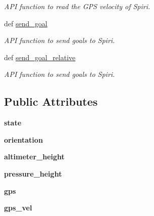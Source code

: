 \begin{DoxyCompactItemize}
\begin{DoxyCompactList}\small\item\em \-A\-P\-I function to read the \-G\-P\-S velocity of \-Spiri. \end{DoxyCompactList}\item 
def \hyperlink{classplanner__request_1_1get__state_1_1_staterobot_a8e0ac5967abcc4612fde86cc3e91654d}{send\-\_\-goal}
\begin{DoxyCompactList}\small\item\em \-A\-P\-I function to send goals to \-Spiri. \end{DoxyCompactList}\item 
def \hyperlink{classplanner__request_1_1get__state_1_1_staterobot_a0bd7ca2bc1f416e09cb2590ae20029a1}{send\-\_\-goal\-\_\-relative}
\begin{DoxyCompactList}\small\item\em \-A\-P\-I function to send goals to \-Spiri. \end{DoxyCompactList}\end{DoxyCompactItemize}
\subsection*{\-Public \-Attributes}
\begin{DoxyCompactItemize}
\item 
\hypertarget{classplanner__request_1_1get__state_1_1_staterobot_a6f7624ca98310fb738be2c82ae05bf19}{{\bfseries state}}\label{classplanner__request_1_1get__state_1_1_staterobot_a6f7624ca98310fb738be2c82ae05bf19}

\item 
\hypertarget{classplanner__request_1_1get__state_1_1_staterobot_a4ee414e859ec2b136f2d56f7f38d9dea}{{\bfseries orientation}}\label{classplanner__request_1_1get__state_1_1_staterobot_a4ee414e859ec2b136f2d56f7f38d9dea}

\item 
\hypertarget{classplanner__request_1_1get__state_1_1_staterobot_af6340244007b1b372f9c63d77ee0aa4f}{{\bfseries altimeter\-\_\-height}}\label{classplanner__request_1_1get__state_1_1_staterobot_af6340244007b1b372f9c63d77ee0aa4f}

\item 
\hypertarget{classplanner__request_1_1get__state_1_1_staterobot_a38c5c4c73acd18fbdc8acc7491073e7f}{{\bfseries pressure\-\_\-height}}\label{classplanner__request_1_1get__state_1_1_staterobot_a38c5c4c73acd18fbdc8acc7491073e7f}

\item 
\hypertarget{classplanner__request_1_1get__state_1_1_staterobot_ae324c8982f5423745a35802b7eba6611}{{\bfseries gps}}\label{classplanner__request_1_1get__state_1_1_staterobot_ae324c8982f5423745a35802b7eba6611}

\item 
\hypertarget{classplanner__request_1_1get__state_1_1_staterobot_a6d1136b6c94b256b380315282f9a2427}{{\bfseries gps\-\_\-vel}}\label{classplanner__request_1_1get__state_1_1_staterobot_a6d1136b6c94b256b380315282f9a2427}

\end{DoxyCompactItemize}



